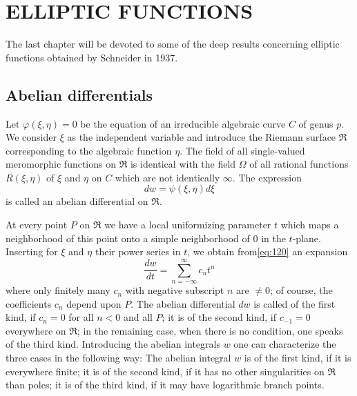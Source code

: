 \chapter{ELLIPTIC FUNCTIONS}\label{sec:chapter4}

The last chapter will be devoted to some of the deep results concerning elliptic functions obtained by Schneider in 1937.

\section{Abelian differentials}\label{sec:4.1}

Let $\varphi(\xi, \eta) = 0$ be the equation of an irreducible algebraic curve $C$ of genus $p$. We consider $\xi$ as the independent variable and introduce the Riemann surface $\mathfrak{R}$ corresponding to the algebraic function $\eta$. The field of all single-valued meromorphic functions on $\mathfrak{R}$ is identical with the field $\Omega$ of all rational functions $R(\xi, \eta)$ of $\xi$ and $\eta$ on $C$ which are not identically $\infty$. The expression
\begin{equation}
dw = \psi(\xi, \eta) d\xi \tag{120}\label{eq:120}
\end{equation}
is called an abelian differential on $\mathfrak{R}$.

At every point $P$ on $\mathfrak{R}$ we have a local uniformizing parameter $t$ which maps a neighborhood of this point onto a simple neighborhood of $0$ in the $t$-plane. Inserting for $\xi$ and $\eta$ their power series in $t$, we obtain from\eqref{eq:120} an expansion
\[
\frac{dw}{dt} = \sum_{n=-\infty}^{\infty} c_n t^n
\]
where only finitely many $c_n$ with negative subscript $n$ are $\neq 0$; of course, the coefficients $c_n$ depend upon $P$. The abelian differential $dw$ is called of the first kind, if $c_n = 0$ for all $n < 0$ and all $P$; it is of the second kind, if $c_{-1} = 0$ everywhere on $\mathfrak{R}$; in the remaining case, when there is no condition, one speaks of the third kind. Introducing the abelian integrals $w$ one can characterize the three cases in the following way: The abelian integral $w$ is of the first kind, if it is everywhere finite; it is of the second kind, if it has no other singularities on $\mathfrak{R}$ than poles; it is of the third kind, if it may have logarithmic branch points.

